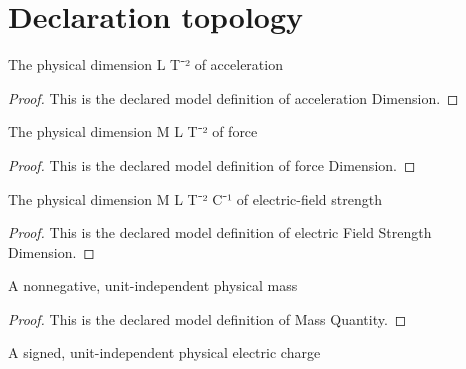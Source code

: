 \section{Declaration topology}
\begin{definition}
  \label{def:physics:phyx-mini-0905:phyxminiproblems-problemphyxmini0905-accelerationdimension}
  The physical dimension L T⁻² of acceleration
\end{definition}
\begin{proof}
  This is the declared model definition of acceleration Dimension.
\end{proof}
\begin{definition}
  \label{def:physics:phyx-mini-0905:phyxminiproblems-problemphyxmini0905-forcedimension}
  The physical dimension M L T⁻² of force
\end{definition}
\begin{proof}
  This is the declared model definition of force Dimension.
\end{proof}
\begin{definition}
  \label{def:physics:phyx-mini-0905:phyxminiproblems-problemphyxmini0905-electricfieldstrengthdimension}
  The physical dimension M L T⁻² C⁻¹ of electric-field strength
\end{definition}
\begin{proof}
  This is the declared model definition of electric Field Strength Dimension.
\end{proof}
\begin{definition}
  \label{def:physics:phyx-mini-0905:phyxminiproblems-problemphyxmini0905-massquantity}
  A nonnegative, unit-independent physical mass
\end{definition}
\begin{proof}
  This is the declared model definition of Mass Quantity.
\end{proof}
\begin{definition}
  \label{def:physics:phyx-mini-0905:phyxminiproblems-problemphyxmini0905-signedchargequantity}
  A signed, unit-independent physical electric charge
\end{definition}
